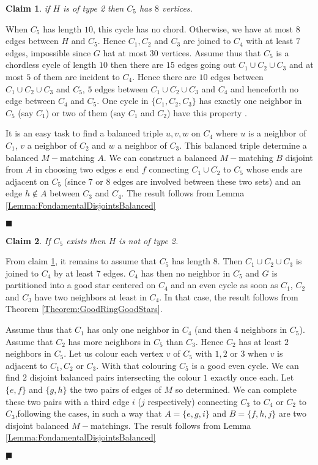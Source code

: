 \documentclass{elsart}
\theoremstyle{plain} \theoremheaderfont{\scshape}
\newtheorem{Clm}{Claim}[Thm]
\newenvironment{Prf}{{\bf \noindent Proof } }{\hfill$\square$\\}
\newenvironment{PrfClaim}{{\bf Proof }}{{\hfill\tiny{$\blacksquare$\\}}}
\begin{document}
\begin{Prf}
\begin{Clm} \label{Claim:Claim4_1_MinimumCounterExample32}
if  $H$ is  of type 2 then $C_5$ has $8$ vertices.
\end{Clm}
\begin{PrfClaim} When $C_5$ has length $10$, this cycle has no chord. Otherwise, we
have at most $8$ edges between $H$ and $C_5$. Hence $C_1,C_2$ and
$C_3$ are joined to $C_4$ with at least $7$ edges, impossible since
$G$ hat at most $30$ vertices. Assume thus that $C_5$ is a chordless
cycle of length $10$ then there are $15$ edges going out $C_1 \cup
C_2 \cup C_3$ and at most $5$ of them are incident to $C_4$. Hence
there are $10$ edges between $C_1 \cup C_2 \cup C_3$ and $C_5$, $5$
edges between $C_1 \cup C_2 \cup C_3$ and $C_4$ and henceforth no
edge between $C_4$ and $C_5$. One cycle in $\{C_1,C_2,C_3\}$ has
exactly one neighbor in $C_5$ (say $C_1$) or two of them (say $C_1$
and $C_2$) have this property .


It is an easy task to find a balanced triple $u,v,w$ on $C_4$ where
$u$ is a neighbor of $C_1$, $v$ a neighbor of $C_2$ and $w$ a
neighbor of $C_3$. This balanced triple determine a balanced
$M-$matching $A$. We can construct a balanced $M-$matching $B$
disjoint from $A$ in choosing two edges $e$ end $f$ connecting $C_1
\cup C_2$ to $C_5$ whose ends are adjacent on $C_5$ (since $7$ or
$8$ edges are involved between these two sets) and an edge $h \not
\in A$ between $C_3$ and $C_4$. The result follows from Lemma
\ref{Lemma:FondamentalDisjointsBalanced}

\end{PrfClaim}

\begin{Clm} \label{Claim:Claim4_2_MinimumCounterExample32}
If $C_5$ exists then $H$ is  not of type 2.
\end{Clm}
\begin{PrfClaim} From claim \ref{Claim:Claim4_1_MinimumCounterExample32}, it remains to assume that
 $C_5$ has length $8$. Then $C_1 \cup C_2 \cup C_3$ is joined to
$C_4$ by at least $7$ edges. $C_4$ has then no neighbor in $C_5$ and
$G$ is partitioned into a good star centered on $C_4$ and an even
cycle as soon as $C_1$, $C_2$ and $C_3$ have two neighbors at least
in $C_4$. In that case, the result follows from Theorem
\ref{Theorem:GoodRingGoodStars}.

Assume thus that $C_1$ has only one neighbor in $C_4$ (and then $4$
neighbors in $C_5$). Assume that $C_2$ has more neighbors in $C_5$
than $C_3$. Hence $C_2$ has at least $2$ neighbors in $C_5$. Let us
colour each vertex $v$ of $C_5$ with $1,2$ or $3$ when $v$ is
adjacent to $C_1,C_2$ or $C_3$. With that colouring $C_5$ is a good
even cycle. We can find $2$ disjoint balanced pairs intersecting the
colour $1$ exactly once each. Let $\{e,f\}$ and $\{g,h\}$ the two
pairs of edges of $M$ so determined. We can complete these two pairs
with a third edge $i$ ($j$ respectively) connecting $C_3$ to $C_4$
or $C_2$ to $C_3$,following the cases, in such a way that
$A=\{e,g,i\}$ and $B=\{f,h,j\}$ are two disjoint balanced
$M-$matchings. The result follows from Lemma
\ref{Lemma:FondamentalDisjointsBalanced}




\end{PrfClaim}
\end{Prf}
\end{document}
